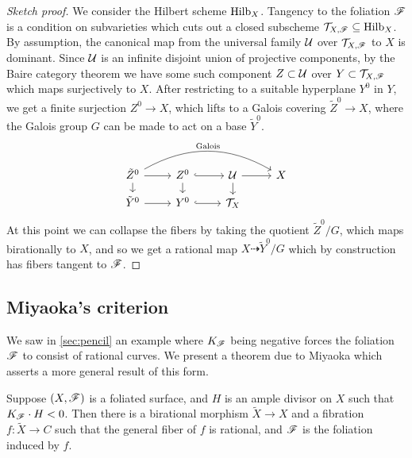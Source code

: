\begin{proof}[Sketch proof]
    We consider the Hilbert scheme $\operatorname{Hilb}_X$. Tangency to the foliation $\mathscr{F}$
    is a condition on subvarieties which cuts out a closed subscheme
    $\mathcal{T}_{X,\mathscr{F}}\subseteq\operatorname{Hilb}_X$. By assumption, the canonical map from the
    universal family $\mathcal{U}$ over $\mathcal{T}_{X,\mathscr{F}}$ to $X$ is dominant. Since
    $\mathcal{U}$ is an infinite disjoint union of projective components, by the Baire
    category theorem we have some such component $Z\subset\mathcal{U}$ over
    $Y\subset\mathcal{T}_{X,\mathscr{F}}$ which maps surjectively to $X$. After restricting
    to a suitable hyperplane $Y^0$ in $Y$, we get a finite surjection
    $Z^0\to X$, which lifts to a Galois covering $\tilde Z^0\to X$, where the
    Galois group $G$ can be made to act on a base $\tilde Y^0$.
    \begin{equation*}
        \begin{tikzcd}[row sep=small]
            \tilde Z^0 \ar[d] \ar[r]
                \ar[rrr,bend left,"\text{Galois}"] &
            Z^0 \ar[d] \ar[r,hook] &
            \calU \ar[d] \ar[r] & X \\
            \tilde Y^0 \ar[r] & Y^0 \ar[r,hook] & \calT_X
        \end{tikzcd}
    \end{equation*}
    At this point we can collapse the fibers by taking the quotient
    $\tilde Z^0/G$, which maps birationally to $X$, and so we get a rational map
    $X\dashrightarrow \tilde Y^0/G$ which by construction has fibers tangent to
    $\mathscr{F}$.
\end{proof}

\subsection{Miyaoka's criterion}

We saw in \cref{sec:pencil} an example where $K_{\mathscr{F}}$ being negative forces the
foliation $\mathscr{F}$ to consist of rational curves. We present a theorem due to
Miyaoka which asserts a more general result of this form.


\begin{theorem}[Miyaoka]
    Suppose $(X,\mathscr{F})$ is a foliated surface, and $H$ is an ample divisor on
    $X$ such that $K_{\mathscr{F}}\cdot H<0$. Then there is a birational morphism
    $\tilde X\to X$ and a fibration $f:\tilde X\to C$ such that the general
    fiber of $f$ is rational, and $\mathscr{F}$ is the foliation induced by $f$.
\end{theorem}

